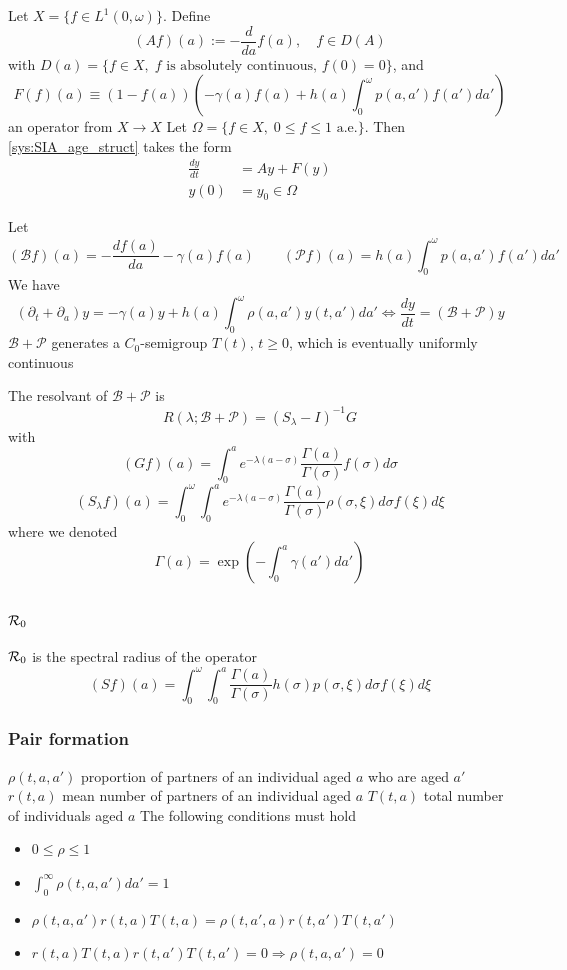 \documentclass[aspectratio=169]{beamer}\usepackage[]{graphicx}\usepackage[]{xcolor}
\begin{document}
\begin{frame}
Let $X=\{f\in L^1(0,\omega)\}$. Define
\[
(Af)(a):=-\frac{d}{da}f(a),\quad f\in D(A)
\]
with $D(a)=\{f\in X,\; f\text{ is absolutely continuous, }f(0)=0\}$,
and
\[
F(f)(a)\equiv (1-f(a))\left(
-\gamma(a)f(a)+h(a)\int_0^\omega p(a,a')f(a')da'\right)
\]
an operator from $X\to X$
\vfill
Let $\Omega=\{f\in X,\; 0\leq f\leq 1\textrm{ a.e.}\}$. Then
\eqref{sys:SIA_age_struct} takes the form
\begin{align*}
\frac{dy}{dt}&= Ay+F(y) \\
y(0)&= y_0\in\Omega
\end{align*}
\end{frame}



\begin{frame}
Let
\[
(\mathcal{B}f)(a)=-\frac{df(a)}{da}-\gamma(a)f(a)
\quad\quad
(\mathcal{P}f)(a)=h(a)\int_0^\omega p(a,a')f(a')da'
\]
\vfill
We have
\[
(\partial_t+\partial_a)y=-\gamma(a)y+h(a)\int_0^\omega
\rho(a,a')y(t,a')da' \Leftrightarrow
\frac{dy}{dt}=(\mathcal{B}+\mathcal{P})y
\]
\vfill
$\mathcal{B}+\mathcal{P}$ generates a $C_0$-semigroup $T(t)$,
$t\geq 0$, which is eventually uniformly continuous
\end{frame}


\begin{frame}
The  resolvant of $\mathcal{B}+\mathcal{P}$ is
\[
R(\lambda;\mathcal{B}+\mathcal{P})=(S_\lambda-I)^{-1}G
\]
with
\[
(Gf)(a)=\int_0^a
e^{-\lambda(a-\sigma)}\frac{\Gamma(a)}{\Gamma(\sigma)}
f(\sigma)d\sigma
\]
\[
(S_\lambda f)(a)=\int_0^\omega\int_0^a
e^{-\lambda(a-\sigma)}\frac{\Gamma(a)}{\Gamma(\sigma)}
\rho(\sigma,\xi)d\sigma f(\xi)d\xi
\]
where we denoted
\[
\Gamma(a)=\exp\left(-\int_0^a \gamma(a')da'\right)
\]
\end{frame}


\begin{frame}\frametitle{$\mathcal{R}_0$}
$\mathcal{R}_0$ is the spectral radius of the operator
\[
(Sf)(a)=\int_0^\omega\int_0^a \frac{\Gamma(a)}{\Gamma(\sigma)}
h(\sigma)p(\sigma,\xi)d\sigma f(\xi)d\xi
\]
\end{frame}


\begin{frame}\frametitle{Pair formation}
$\rho(t,a,a')$ proportion of partners of an individual aged $a$ who are aged $a'$
\vfill
$r(t,a)$ mean number of partners of an individual aged $a$
\vfill
$T(t,a)$ total number of individuals aged $a$
\vfill
The following conditions must hold
\begin{itemize}
\item $0\leq\rho\leq 1$
\item $\int_0^\infty \rho(t,a,a')da'=1$
\item $\rho(t,a,a')r(t,a)T(t,a)=\rho(t,a',a)r(t,a')T(t,a')$
\item $r(t,a)T(t,a)r(t,a')T(t,a')=0\Rightarrow \rho(t,a,a')=0$
\end{itemize}
\end{frame}
\end{document}
